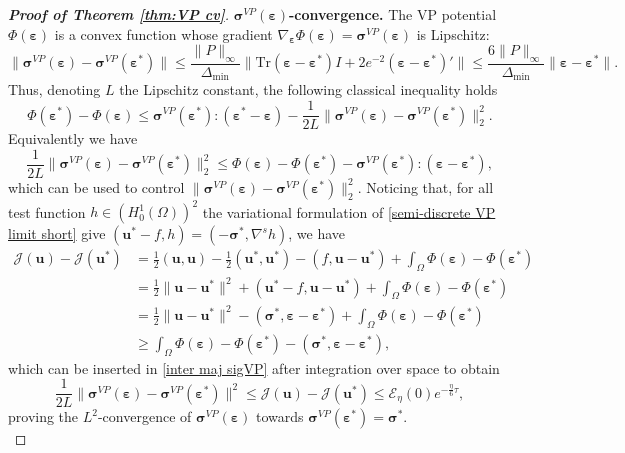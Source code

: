 \documentclass[11pt]{article}
\newcommand{\bu}{\mathbf{u}}
\newcommand{\sig}{\boldsymbol{\sigma}}
\newcommand{\beps}{\boldsymbol{\varepsilon}}
\begin{document}
\begin{proof}[\textbf{Proof of Theorem \ref{thm:VP cv}}]
\noindent \textbf{$\sig^{VP}(\beps)$-convergence.} The VP potential $\Phi(\beps)$ is a convex function whose gradient $\nabla_{\beps}\Phi(\beps) = \sig^{VP}(\beps)$ is Lipschitz:
$$\|\sig^{VP}(\beps)-\sig^{VP}(\beps^*)\| \leq \frac{\|P\|_\infty}{\Delta_{\min}} \| \text{Tr} (\beps-\beps^*) I + 2 e^{-2}(\beps-\beps^*)'\| \leq \frac{6 \|P\|_\infty}{\Delta_{\min}}  \|\beps-\beps^*\|.
$$Thus, denoting $L$ the Lipschitz constant, the following classical inequality holds
\begin{equation}
    \Phi(\beps^*) - \Phi(\beps) \leq \sig^{VP}(\beps^*):(\beps^*-\beps)-\frac{1}{2L}\|\sig^{VP}(\beps)-\sig^{VP}(\beps^*)\|_2^2.
    \label{inter maj sigVP}
\end{equation}Equivalently we have
\begin{equation}
    \frac{1}{2L}\|\sig^{VP}(\beps)-\sig^{VP}(\beps^*)\|_2^2 \leq \Phi(\beps) - \Phi(\beps^*) - \sig^{VP}(\beps^*):(\beps-\beps^*),
    \label{inter maj sigVP}
\end{equation}
which can be used to control $\|\sig^{VP}(\beps)-\sig^{VP}(\beps^*)\|_2^2$.
Noticing that, for all test function $h \in (H^1_0(\Omega))^2$ the variational formulation of \eqref{semi-discrete VP limit short} give $(\bu^*-f, h) = (-\sig^*, \nabla^s h) $, we have
$$
\begin{aligned}
    \mathcal{J}(\bu)-\mathcal{J}(\bu^*) &=  \frac12 (\bu,\bu)-\frac12 (\bu^*,\bu^*)-(f,\bu-\bu^*)+ \int_\Omega \Phi(\beps)-\Phi(\beps^*)\\
    &= \frac12 \|\bu-\bu^*\|^2 + (\bu^*-f, \bu-\bu^*)+ \int_\Omega \Phi(\beps)-\Phi(\beps^*)\\
    &= \frac12 \|\bu-\bu^*\|^2 - (\sig^*, \beps-\beps^*)+ \int_\Omega \Phi(\beps)-\Phi(\beps^*)\\
    &\ge \int_\Omega \Phi(\beps)-\Phi(\beps^*)- (\sig^*, \beps-\beps^*) ,
\end{aligned}
$$which can be inserted in \eqref{inter maj sigVP} after integration over space to obtain
\begin{equation*}
    \frac{1}{2L}\|\sig^{VP}(\beps)-\sig^{VP}(\beps^*)\|^2 \leq \mathcal{J}(\bu) - \mathcal{J}(\bu^*)\leq \mathcal{E}_\eta (0)e^{-\frac{\eta}{6}  \tau},
\end{equation*}proving the $L^2$-convergence of $\sig^{VP}(\beps)$ towards $\sig^{VP}(\beps^*) = \sig^*$.\\


\end{proof}
\end{document}
